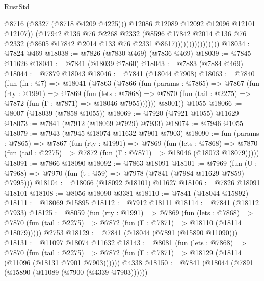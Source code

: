\begin{lexlean}{RustStd}
\begin{coremodule}
                                    @8716
                                    (@8327 (@8718 @4209 @4225)))
                                  @12086
                                  @12089
                                  @12092
                                  @12096
                                  @12101
                                  @12107))
                              (@17942
                                @136
                                @76
                                @2268
                                @2332
                                (@8596
                                  @17842
                                  @2014
                                  @136
                                  @76
                                  @2332
                                  (@8605 @17842 @2014 @133 @76 @2331 @8617))))))))))))))))
@18034 := @7824 @469
@18038 := @7826 (@7830 @469) (@7836 @469)
@18039 := @7845 @11626
@18041 := @7841 (@18039 @7860)
@18043 := @7883 (@7884 @469)
@18044 := @7879 @18043
@18046 := @7841 (@18044 @7908)
@18063 := @7840
    (fun (fn : @7) =>
    @18041
      (@7863
        (@7866
          (fun (params : @7865) =>
          @7867
            (fun (rty : @1991) =>
            @7869
              (fun (lets : @7868) =>
              @7870 (fun (tail : @2275) => @7872 (fun (Γ : @7871) => @18046 @7955))))))
        @8001))
    @1055
@18066 := @8007 (@18039 (@7858 @1055))
@18069 := @7920 (@7921 @1055) @11629
@18073 := @7841 (@7912 (@18069 @7929) @7933)
@18074 := @7946 @1055
@18079 := @7943 (@7945 @18074 @11632 @7901 @7903)
@18090 := fun (params : @7865) =>
  @7867
    (fun (rty : @1991) =>
    @7869
      (fun (lets : @7868) =>
      @7870 (fun (tail : @2275) => @7872 (fun (Γ : @7871) => @18046 (@18073 @18079)))))
@18091 := @7866 @18090
@18092 := @7863 @18091
@18101 := @7969
    (fun (U : @7968) => @7970 (fun (t : @59) => @7978 (@7841 (@7984 @11629 @7859) @7995)))
@18104 := @18066 (@18092 @18101) @11627
@18106 := @7826 @18091 @18101
@18108 := @8056 @18090 @3381
@18110 := @7841 (@18044 @15892)
@18111 := @18069 @15895
@18112 := @7912 @18111
@18114 := @7841 (@18112 @7933)
@18125 := @8059
    (fun (rty : @1991) =>
    @7869
      (fun (lets : @7868) =>
      @7870 (fun (tail : @2275) => @7872 (fun (Γ : @7871) => @18110 (@18114 @18079)))))
    @2753
@18129 := @7841 (@18044 (@7891 (@15890 @11090)))
@18131 := @11097 @18074 @11632
@18143 := @8081
    (fun (lets : @7868) =>
    @7870
      (fun (tail : @2275) =>
      @7872 (fun (Γ : @7871) => @18129 (@18114 (@11096 (@18131 @7901 @7903))))))
    @4338
@18150 := @7841 (@18044 (@7891 (@15890 (@11089 (@7900 (@4339 @7903))))))

\end{coremodule}
\end{lexlean}
